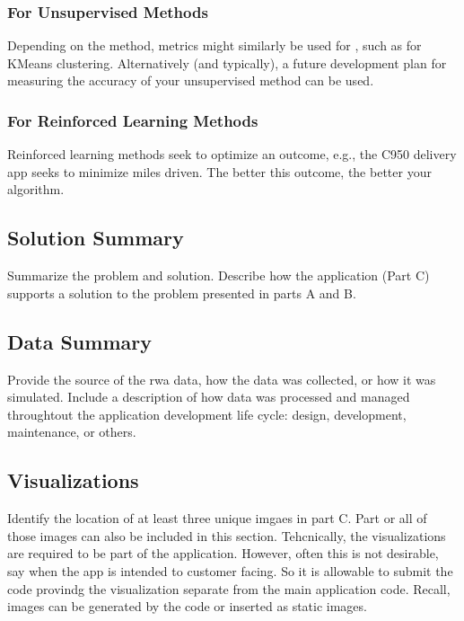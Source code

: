 \documentclass[letterpaper,10pt,english]{jupyterBook}
\begin{document}
\subsubsection{For Unsupervised Methods}
\label{\detokenize{task2_doc/task2_doc_d:for-unsupervised-methods}}
\sphinxAtStartPar
Depending on the method, metrics might similarly be used for , such as  for KMeans clustering. Alternatively (and typically), a future development plan for measuring the accuracy of your unsupervised method can be used.


\subsubsection{For Reinforced Learning Methods}
\label{\detokenize{task2_doc/task2_doc_d:for-reinforced-learning-methods}}
\sphinxAtStartPar
Reinforced learning methods seek to optimize an outcome, e.g., the C950 delivery app seeks to minimize miles driven. The better this outcome, the better your algorithm.


\subsection{Solution Summary}
\label{\detokenize{task2_doc/task2_doc_d:solution-summary}}
\sphinxAtStartPar
Summarize the problem and solution. Describe how the application (Part C) supports a solution to the problem presented in parts A and B.


\subsection{Data Summary}
\label{\detokenize{task2_doc/task2_doc_d:data-summary}}
\sphinxAtStartPar
Provide the source of the rwa data, how the data was collected, or how it was simulated. Include a description of how data was processed and managed throughtout the application development life cycle: design, development, maintenance, or others.


\subsection{Visualizations}
\label{\detokenize{task2_doc/task2_doc_d:visualizations}}
\sphinxAtStartPar
Identify the location of at least three unique imgaes in part C. Part or all of those images can also be included in this section. Tehcnically, the visualizations are required to be part of the application. However, often this is not desirable, say when the app is intended to customer facing. So it is allowable to submit the code provindg the visualization separate from the main application code. Recall, images can be generated by the code or inserted as static images.
\end{document}

